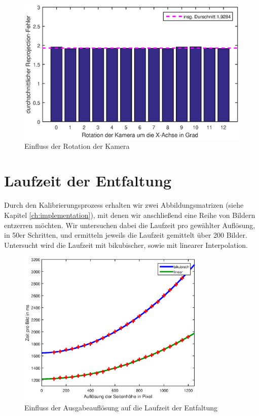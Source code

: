 \begin{figure}[!htb]
	\centering
	\includegraphics[width=\textwidth]{images/reprojectionErrorDeg2.eps}
	\caption{Einfluss der Rotation der Kamera}
	\label{fig:influenceRot}
\end{figure}


\section{Laufzeit der Entfaltung}
Durch den Kalibrierungsprozess erhalten wir zwei Abbildungsmatrizen (siehe Kapitel \ref{ch:implementation}), mit denen wir anschließend eine Reihe von Bildern entzerren möchten. Wir untersuchen dabei die Laufzeit pro gewählter Auflösung, in 50er Schritten, und ermitteln jeweils die Laufzeit gemittelt über 200 Bilder. Untersucht wird die Laufzeit mit bikubischer, sowie mit linearer Interpolation. 

\begin{figure}[!htb]
	\centering
	\includegraphics[width=0.8\textwidth]{images/runningTimePerSlantheight.eps}
	\caption{Einfluss der Ausgabeauflösung auf die Laufzeit der Entfaltung}
	\label{fig:influenceRes2}
\end{figure}

